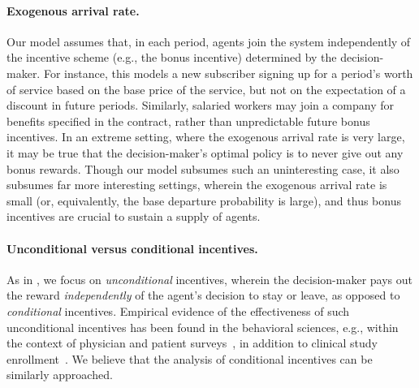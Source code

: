 \documentclass[12pt]{article}
\begin{document}
\paragraph{Exogenous arrival rate.} Our model assumes that, in each period, agents join the system independently of the incentive scheme (e.g., the bonus incentive) determined by the decision-maker. For instance, this models a new subscriber signing up for a period's worth of service based on the base price of the service, but not on the expectation of a discount in future periods. Similarly, salaried workers may join a company for benefits specified in the contract, rather than unpredictable future bonus incentives. In an extreme setting, where the exogenous arrival rate is very large, it may be true that the decision-maker's optimal policy is to never give out any bonus rewards. Though our model subsumes such an uninteresting case, it also subsumes far more interesting settings, wherein the exogenous arrival rate is small (or, equivalently, the base departure probability is large), and thus bonus incentives are crucial to sustain a supply of agents.

\paragraph{Unconditional versus conditional incentives.}  As in \cite{lemmens2020managing}, we focus on {\it unconditional} incentives, wherein the decision-maker pays out the reward {\it independently} of the agent's decision to stay or leave, as opposed to {\it conditional} incentives. Empirical evidence of the effectiveness of such unconditional incentives has been found in the behavioral sciences, e.g., within the context of physician and patient surveys~\cite{abdulaziz2015national,young2015unconditional,rosoff2005response}, in addition to clinical study enrollment~\cite{young2020unconditional,kumar2022randomized}. {We believe that the analysis of conditional incentives can be similarly approached.}
\end{document}
